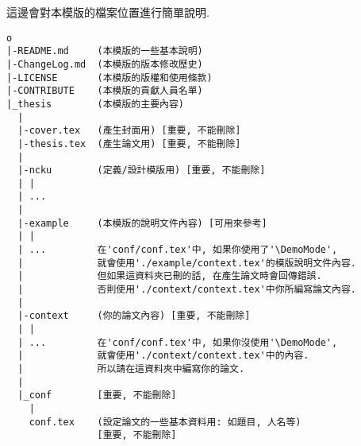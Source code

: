 
這邊會對本模版的檔案位置進行簡單說明.\\

\begin{DescriptionFrame}
\begin{verbatim}
o
|-README.md     (本模版的一些基本說明)
|-ChangeLog.md  (本模版的版本修改歷史)
|-LICENSE       (本模版的版權和使用條款)
|-CONTRIBUTE    (本模版的貢獻人員名單)
|_thesis        (本模版的主要內容)
  |
  |-cover.tex   (產生封面用) [重要, 不能刪除]
  |-thesis.tex  (產生論文用) [重要, 不能刪除]
  | 
  |-ncku        (定義/設計模版用) [重要, 不能刪除]
  | |
  | ...
  |
  |-example     (本模版的說明文件內容) [可用來參考]
  | |
  | ...         在'conf/conf.tex'中, 如果你使用了'\DemoMode',
  |             就會使用'./example/context.tex'的模版說明文件內容.
  |             但如果這資料夾已刪的話, 在產生論文時會回傳錯誤.
  |             否則使用'./context/context.tex'中你所編寫論文內容.
  |
  |-context     (你的論文內容) [重要, 不能刪除]
  | |
  | ...         在'conf/conf.tex'中, 如果你沒使用'\DemoMode',
  |             就會使用'./context/context.tex'中的內容.
  |             所以請在這資料夾中編寫你的論文.
  |
  |_conf        [重要, 不能刪除]
    |
    conf.tex    (設定論文的一些基本資料用: 如題目, 人名等)
                [重要, 不能刪除]
\end{verbatim}
\end{DescriptionFrame}
